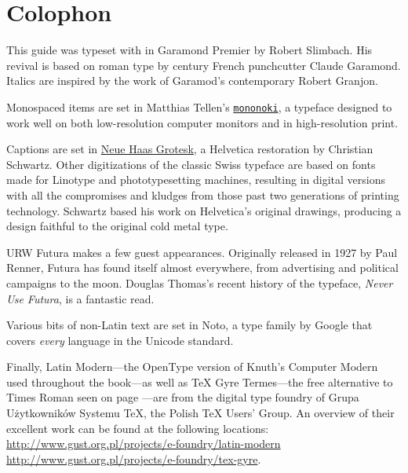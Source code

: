 \backmatter


{\raggedright
\renewcommand\makeenmark{\theenmark.\enspace}
\theendnotes
}

{\let\cleardoublepage\clearpage \chapter{Colophon}}

This guide was typeset with \LuaLaTeX{} in Garamond Premier by Robert Slimbach.
His revival is based on roman type by
 century French
punchcutter Claude Garamond.
Italics are inspired by the work of Garamod's contemporary Robert Granjon.

Monospaced items are set in Matthias Tellen's
\href{https://madmalik.github.io/mononoki/}{\texttt{mononoki}},
a typeface designed to work well on both low-resolution computer monitors
and in high-resolution print.

Captions are set in
\href{http://www.fontbureau.com/NHG/}{\textsf{\small Neue Haas Grotesk}},
a Helvetica restoration by Christian Schwartz.
Other digitizations of the classic Swiss typeface are based on fonts made for
Linotype and phototypesetting machines,
resulting in digital versions with all the compromises and kludges from those
past two generations of printing technology.
Schwartz based his work on Helvetica's original drawings,
producing a design faithful to the original cold metal type.

{URW Futura}
makes a few guest appearances.
Originally released in 1927 by Paul Renner,
Futura has found itself almost everywhere,
from advertising and political campaigns to the moon.
Douglas Thomas's recent history of the typeface,
\textit{Never Use Futura}, is a fantastic read.

Various bits of non-Latin text are set in
{Noto},
a type family by Google that covers \emph{every} language
in the Unicode standard.

Finally,
{\lm Latin Modern}---the OpenType version of Knuth's Computer Modern used throughout
the book---as well
as {\TeX{} Gyre Termes}---the
free alternative to Times Roman seen on page \pageref{typography}---are from
the digital type foundry of Grupa Użytkowników Systemu \TeX{},
the Polish \TeX{} Users' Group.
An overview of their excellent work can be found at the following locations:\\
\url{http://www.gust.org.pl/projects/e-foundry/latin-modern} \\
\url{http://www.gust.org.pl/projects/e-foundry/tex-gyre}.
